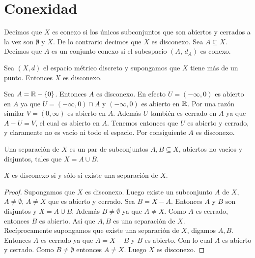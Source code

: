 \section{Conexidad}

 
 \begin{definicion}
 Decimos que $X$ es conexo si los únicos subconjuntos que son abiertos y cerrados a la vez son $\emptyset$ y $X$. De lo contrario decimos que $X$ es disconexo. Sea $A\subseteq X$. Decimos que $A$ es un conjunto conexo si el subespacio $(A,\, d_A)$ es conexo.
 \end{definicion}

\begin{example}
Sea $(X,d)$ el espacio métrico discreto y supongamos que $X$ tiene más de un punto. Entonces $X$ es disconexo.
\end{example}

\begin{example}
Sea $A=\mathbb{R}-\{0\}$. Entonces $A$ es disconexo. En efecto $U=(-\infty , 0)$ es abierto en $A$ ya que \linebreak $U=(-\infty , 0) \cap A$ y $(-\infty , 0)$ es abierto en $\mathbb{R}$. Por una razón similar $V=(0, \infty)$
 es abierto en $A$. Además  $U$ también es cerrado en $A$ ya que $A- U=V$, el cual es abierto en $A$. Tenemos entonces que $U$ es abierto y cerrado, y claramente no es vacío ni todo el espacio. Por consiguiente $A$ es disconexo.
 \end{example}

\begin{definicion}
Una separación de $X$ es un par de subconjuntos $A, B \subseteq X$, abiertos no vacíos y disjuntos, tales que $X=A\cup B$.
\end{definicion}

\begin{teorema}
$X$ es disconexo si y sólo si existe una separación de $X$.
\end{teorema}
\begin{proof}
Supongamos que $X$ es disconexo. Luego existe un subconjunto $A$ de $X$, $A\neq \emptyset$, $A\neq X$ que es abierto y cerrado. Sea $B=X-A$. Entonces $A$ y $B$ son disjuntos y $X=A\cup B$. Además $B\neq \emptyset$ ya que $A\neq X$. Como $A $ es cerrado, entonces $B$ es abierto. Así que $A,B$ es una separación de $X$.\\
Recíprocamente supongamos que existe una separación de $X$, digamos $A,B$. Entonces $A$ es cerrado ya que $A=X-B$ y $B$ es abierto. Con lo cual $A$ es abierto y cerrado. Como $B\neq \emptyset$ entonces $A \neq X$. Luego $X$ es disconexo.
\end{proof}

